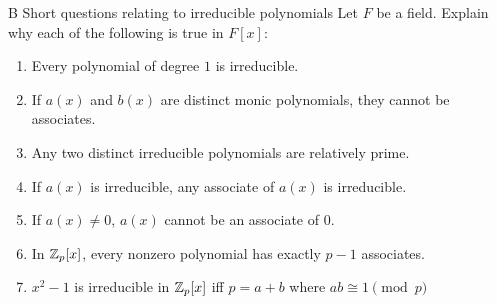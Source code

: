\begin{exercise}{B Short questions relating to irreducible polynomials}
Let $F$ be a field. Explain why each of the following is true in $F[x]$:
\begin{enumerate}
    \item Every polynomial of degree $1$ is irreducible.
    \item If $a(x)$ and $b(x)$ are distinct monic polynomials, they cannot be associates.
    \item Any two distinct irreducible polynomials are relatively prime.
    \item If $a(x)$ is irreducible, any associate of $a(x)$ is irreducible.
    \item If $a(x)\neq 0$, $a(x)$ cannot be an associate of $0$.
    \item In $\mathbb{Z}_p[x]$, every nonzero polynomial has exactly $p-1$ associates.
    \item $x^2-1$ is irreducible in $\mathbb{Z}_p[x]$ iff $p=a+b$ where $ab\cong 1\pmod{p}$
\end{enumerate}
\end{exercise}
